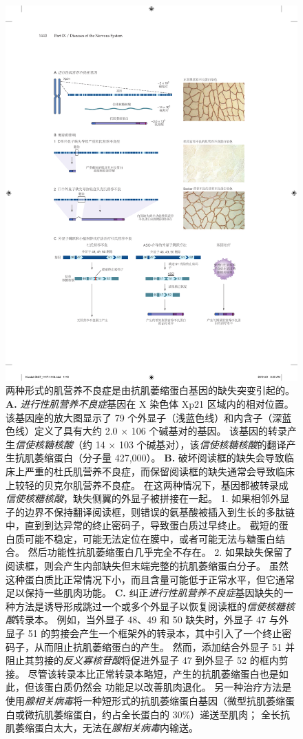 \begin{figure}[htbp]
	\centering
	\includegraphics[width=0.85\linewidth]{chap57/fig_57_10}
	\caption{两种形式的肌营养不良症是由抗肌萎缩蛋白基因的缺失突变引起的\cite{hoffman1987dystrophin}。
		\textbf{A.} \textit{进行性肌营养不良症}基因在 X 染色体 Xp21 区域内的相对位置。
		该基因座的放大图显示了 79 个外显子（浅蓝色线）和内含子（深蓝色线）定义了具有大约 2.0 × 106 个碱基对的基因。
		该基因的转录产生\textit{信使核糖核酸}（约 14 × 103 个碱基对），该\textit{信使核糖核酸}的翻译产生抗肌萎缩蛋白（分子量 427,000）。
		\textbf{B.} 破坏阅读框的缺失会导致临床上严重的杜氏肌营养不良症，而保留阅读框的缺失通常会导致临床上较轻的贝克尔肌营养不良症。
		在这两种情况下，基因都被转录成\textit{信使核糖核酸}，缺失侧翼的外显子被拼接在一起。
		1. 如果相邻外显子的边界不保持翻译阅读框，则错误的氨基酸被插入到生长的多肽链中，直到到达异常的终止密码子，导致蛋白质过早终止。
		截短的蛋白质可能不稳定，可能无法定位在膜中，或者可能无法与糖蛋白结合。
		然后功能性抗肌萎缩蛋白几乎完全不存在。
		2. 如果缺失保留了阅读框，则会产生内部缺失但末端完整的抗肌萎缩蛋白分子。
		虽然这种蛋白质比正常情况下小，而且含量可能低于正常水平，但它通常足以保持一些肌肉功能。
		\textbf{C.} 纠正\textit{进行性肌营养不良症}基因缺失的一种方法是诱导形成跳过一个或多个外显子以恢复阅读框的\textit{信使核糖核酸}转录本。
		例如，当外显子 48、49 和 50 缺失时，外显子 47 与外显子 51 的剪接会产生一个框架外的转录本，其中引入了一个终止密码子，从而阻止抗肌萎缩蛋白的产生。
		然而，添加结合外显子 51 并阻止其剪接的\textit{反义寡核苷酸}将促进外显子 47 到外显子 52 的框内剪接。
		尽管该转录本比正常转录本略短，产生的抗肌萎缩蛋白也是如此，但该蛋白质仍然会 功能足以改善肌肉退化。
		另一种治疗方法是使用\textit{腺相关病毒}将一种短形式的抗肌萎缩蛋白基因（微型抗肌萎缩蛋白或微抗肌萎缩蛋白，约占全长蛋白的 30\%）递送至肌肉；
		全长抗肌萎缩蛋白太大，无法在\textit{腺相关病毒}内输送。}
	\label{fig:57_10}
\end{figure}


